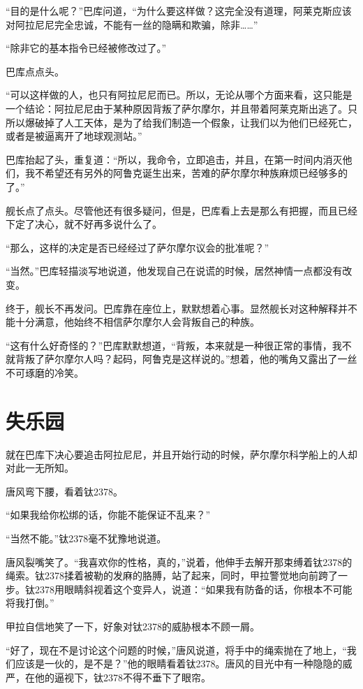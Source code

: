“目的是什么呢？”巴库问道，“为什么要这样做？这完全没有道理，阿莱克斯应该对阿拉尼尼完全忠诚，不能有一丝的隐瞒和欺骗，除非……” 

“除非它的基本指令已经被修改过了。” 

巴库点点头。 

“可以这样做的人，也只有阿拉尼尼而已。所以，无论从哪个方面来看，这只能是一个结论：阿拉尼尼由于某种原因背叛了萨尔摩尔，并且带着阿莱克斯出逃了。只所以爆破掉了人工天体，是为了给我们制造一个假象，让我们以为他们已经死亡，或者是被逼离开了地球观测站。” 

巴库抬起了头，重复道：“所以，我命令，立即追击，并且，在第一时间内消灭他们，我不希望还有另外的阿鲁克诞生出来，苦难的萨尔摩尔种族麻烦已经够多的了。” 

舰长点了点头。尽管他还有很多疑问，但是，巴库看上去是那么有把握，而且已经下定了决心，就不好再多说什么了。 

“那么，这样的决定是否已经经过了萨尔摩尔议会的批准呢？” 

“当然。”巴库轻描淡写地说道，他发现自己在说谎的时候，居然神情一点都没有改变。 

终于，舰长不再发问。巴库靠在座位上，默默想着心事。显然舰长对这种解释并不能十分满意，他始终不相信萨尔摩尔人会背叛自己的种族。 

“这有什么好奇怪的？”巴库默默想道，“背叛，本来就是一种很正常的事情，我不就背叛了萨尔摩尔人吗？起码，阿鲁克是这样说的。”想着，他的嘴角又露出了一丝不可琢磨的冷笑。 

\chapter{失乐园}

就在巴库下决心要追击阿拉尼尼，并且开始行动的时候，萨尔摩尔科学船上的人却对此一无所知。 

唐风弯下腰，看着钛2378。 

“如果我给你松绑的话，你能不能保证不乱来？” 

“当然不能。”钛2378毫不犹豫地说道。 

唐风裂嘴笑了。“我喜欢你的性格，真的，”说着，他伸手去解开那束缚着钛2378的绳索。钛2378揉着被勒的发麻的胳膊，站了起来，同时，甲拉警觉地向前跨了一步。钛2378用眼睛斜视着这个变异人，说道：“如果我有防备的话，你根本不可能将我打倒。” 

甲拉自信地笑了一下，好象对钛2378的威胁根本不顾一屑。 

“好了，现在不是讨论这个问题的时候，”唐风说道，将手中的绳索抛在了地上，“我们应该是一伙的，是不是？”他的眼睛看着钛2378。唐风的目光中有一种隐隐的威严，在他的逼视下，钛2378不得不垂下了眼帘。 

